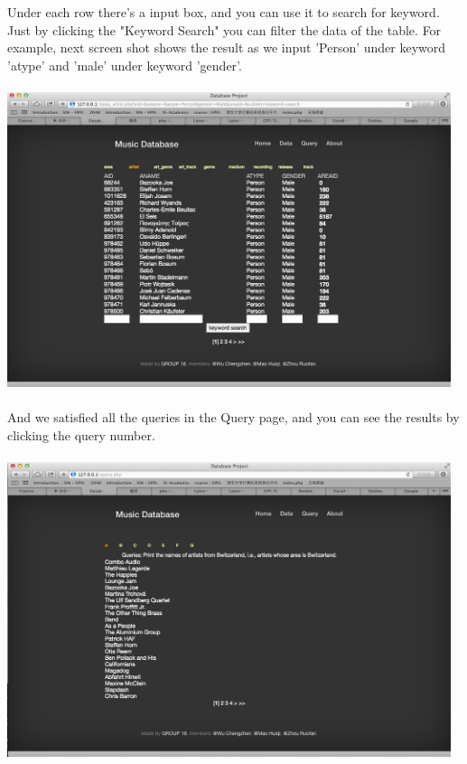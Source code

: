\documentclass[11pt]{article} %
\begin{document}
{Under each row there's a input box, and you can use it to search for keyword. Just by clicking the "Keyword Search" you can filter the data of the table. For example, next screen shot shows the result as we input 'Person' under keyword 'atype' and 'male' under keyword 'gender'. \\ \\
\includegraphics[width=13cm]{interface3}\\ \\
And we satisfied all the queries in the Query page, and you can see the results by clicking the query number.\\ \\
\includegraphics[width=13cm]{interface4}\\ \\
}
\end{document}
